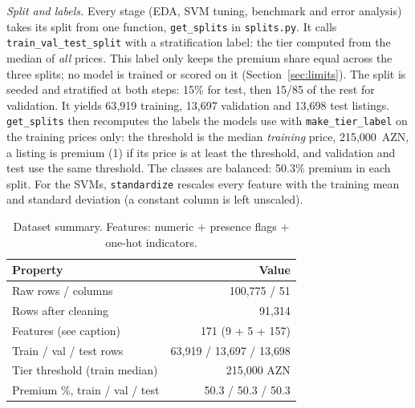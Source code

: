 \documentclass[10pt,twocolumn,a4paper]{article}
\begin{document}
\textit{Split and labels.} Every stage (EDA, SVM tuning, benchmark and
error analysis) takes its split from one function,
\texttt{get\_splits} in \texttt{splits.py}. %
It calls \texttt{train\_val\_test\_split} with a stratification label:
the tier computed from the median of \emph{all} prices. This label only
keeps the premium share equal across the three splits; no model is
trained or scored on it (Section~\ref{sec:limits}). %
The split is seeded and stratified at both steps: 15\% for test, then
15/85 of the rest for validation. %
It yields 63{,}919 training, %
13{,}697 validation %
and 13{,}698 test listings. %
\texttt{get\_splits} then recomputes the labels the models use with
\texttt{make\_tier\_label} on the training prices only: the threshold
is the median \emph{training} price, 215{,}000~AZN, %
a listing is premium (1) if its price is at least the threshold, and %
validation and test use the same threshold. %
The classes are balanced: 50.3\% premium in each split. %
For the SVMs, \texttt{standardize} rescales every feature with the
training mean and standard deviation (a constant column is left
unscaled). %

\begin{table}[t]
  \centering
  \caption{Dataset summary. Features: numeric + presence flags + one-hot indicators.}
  \label{tab:data}
  \begin{tabular}{@{}lr@{}}
    \toprule
    Property & Value \\
    \midrule
    Raw rows / columns          & 100{,}775 / 51 \\ %
    Rows after cleaning         & 91{,}314 \\ %
    Features (see caption)      & 171 (9 + 5 + 157) \\ %
    Train / val / test rows     & 63{,}919 / 13{,}697 / 13{,}698 \\ %
    Tier threshold (train median) & 215{,}000 AZN \\ %
    Premium \%, train / val / test & 50.3 / 50.3 / 50.3 \\ %
    \bottomrule
  \end{tabular}
\end{table}
\end{document}
